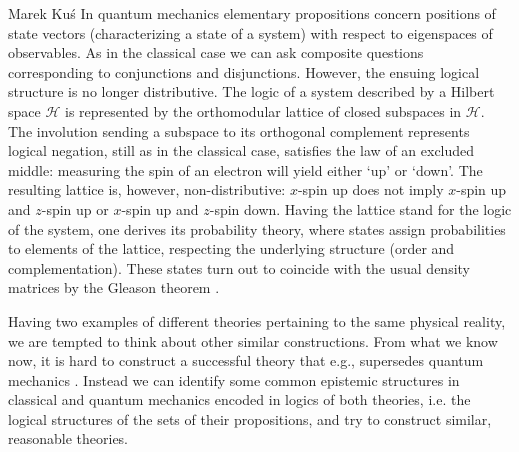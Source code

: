 \begin{artengenv}{Marek Ku\'s}
In quantum mechanics elementary propositions concern positions of state vectors (characterizing a state of a system) with respect to eigenspaces of observables. As in the classical case we can ask composite questions corresponding to conjunctions and disjunctions. However, the ensuing logical structure is no longer distributive. The logic of a system described by a  Hilbert space $\mathcal{H} $ is represented by the orthomodular lattice of  closed subspaces in $\mathcal{H}$. The involution sending a subspace to its  orthogonal complement represents logical negation, still as in the classical case, satisfies  the law  of an excluded middle: measuring the spin of an electron will yield either `up' or `down'. The  resulting lattice is, however,  non-distributive: $x$-spin up does not imply $x$-spin up and  $z$-spin up or $x$-spin up and $z$-spin down. Having the lattice stand for the logic of the system, one derives its probability theory, where  states assign probabilities to elements of the lattice, respecting the underlying structure (order and complementation). These states turn out to coincide with the usual density matrices by the Gleason theorem \parencite{gleason_measures_1957}.


Having two examples of different theories pertaining to the same physical reality, we are tempted to think about other similar constructions. From what we know now, it is hard to construct a successful theory that e.g., supersedes quantum mechanics \parencite{aaronson_is_2004}. Instead we can identify some common epistemic structures in classical and quantum mechanics encoded in logics of both theories, i.e. the logical structures of the sets of their propositions, and try to construct similar, reasonable theories.


\end{artengenv}
